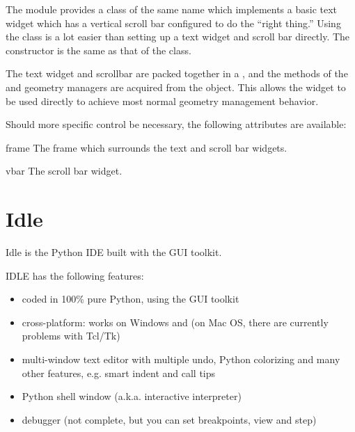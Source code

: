 The  module provides a class of the same name
which implements a basic text widget which has a vertical scroll bar
configured to do the ``right thing.''  Using the 
class is a lot easier than setting up a text widget and scroll bar
directly.  The constructor is the same as that of the
 class.

The text widget and scrollbar are packed together in a ,
and the methods of the  and  geometry managers
are acquired from the  object.  This allows the
 widget to be used directly to achieve most normal
geometry management behavior.

Should more specific control be necessary, the following attributes
are available:

\begin{memberdesc}[ScrolledText]{frame}
  The frame which surrounds the text and scroll bar widgets.
\end{memberdesc}

\begin{memberdesc}[ScrolledText]{vbar}
  The scroll bar widget.
\end{memberdesc}





\section{Idle \label{idle}}


Idle is the Python IDE built with the  GUI toolkit.  


IDLE has the following features:

\begin{itemize}
\item   coded in 100\% pure Python, using the  GUI toolkit

\item   cross-platform: works on Windows and \UNIX{} (on Mac OS, there are
currently problems with Tcl/Tk)

\item   multi-window text editor with multiple undo, Python colorizing
and many other features, e.g. smart indent and call tips

\item   Python shell window (a.k.a. interactive interpreter)

\item   debugger (not complete, but you can set breakpoints, view  and step)
\end{itemize}


